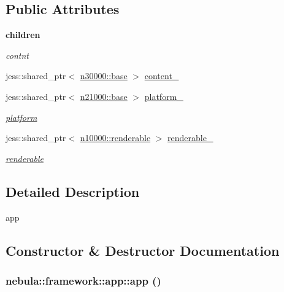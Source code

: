 \subsection*{Public Attributes}
\begin{Indent}{\bf children}\par
{\em \label{_amgrp268184c12df027f536154d099d497b31}
 contnt }\begin{DoxyCompactItemize}
\item 
jess::shared\_\-ptr$<$ \hyperlink{classnebula_1_1content_1_1base}{n30000::base} $>$ \hyperlink{classnebula_1_1framework_1_1app_a97da5a51c1a93025a03b3aeeff013e63}{content\_\-}
\item 
jess::shared\_\-ptr$<$ \hyperlink{classnebula_1_1platform_1_1platform_1_1base}{n21000::base} $>$ \hyperlink{classnebula_1_1framework_1_1app_a02894b2958189478845ce624ad4b92a9}{platform\_\-}
\begin{DoxyCompactList}\small\item\em \hyperlink{namespacenebula_1_1platform}{platform} \item\end{DoxyCompactList}\item 
jess::shared\_\-ptr$<$ \hyperlink{classnebula_1_1framework_1_1renderable}{n10000::renderable} $>$ \hyperlink{classnebula_1_1framework_1_1app_ae316f80ddb05de0580af8a0b4d9fcb57}{renderable\_\-}
\begin{DoxyCompactList}\small\item\em \hyperlink{classnebula_1_1framework_1_1renderable}{renderable} \item\end{DoxyCompactList}\end{DoxyCompactItemize}
\end{Indent}


\subsection{Detailed Description}
app 

\subsection{Constructor \& Destructor Documentation}
\hypertarget{classnebula_1_1framework_1_1app_a6647b29dd741f88e1d8a6d0246935ffd}{
\subsubsection[{app}]{\setlength{\rightskip}{0pt plus 5cm}nebula::framework::app::app ()}}
\label{classnebula_1_1framework_1_1app_a6647b29dd741f88e1d8a6d0246935ffd}


